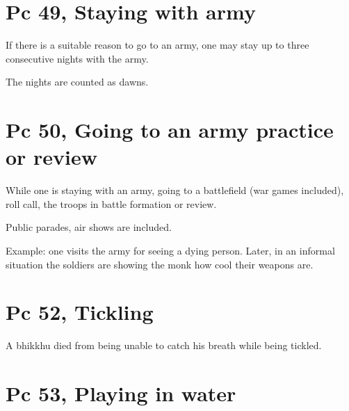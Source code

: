 \section{Pc 49, Staying with army}

If there is a suitable reason to go to an army, one may stay up to three
consecutive nights with the army.

The nights are counted as dawns.

\section{Pc 50, Going to an army practice or review}

While one is staying with an army, going to a battlefield (war games
included), roll call, the troops in battle formation or review.

Public parades, air shows are included.

Example: one visits the army for seeing a dying person. Later, in an
informal situation the soldiers are showing the monk how cool their
weapons are.

\clearpage

\section{Pc 52, Tickling}

A bhikkhu died from being unable to catch his breath while being
tickled.

\section{Pc 53, Playing in water}

